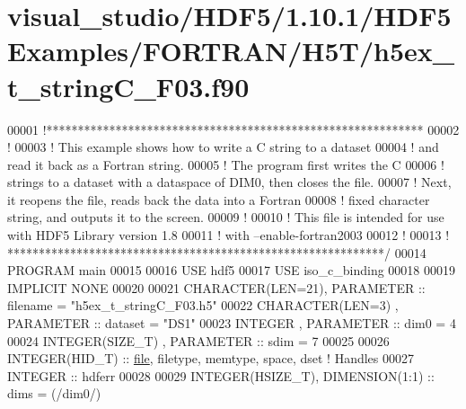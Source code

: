 \hypertarget{visual__studio_2_h_d_f5_21_810_81_2_h_d_f5_examples_2_f_o_r_t_r_a_n_2_h5_t_2h5ex__t__string_c___f03_8f90_source}{}\section{visual\+\_\+studio/\+H\+D\+F5/1.10.1/\+H\+D\+F5\+Examples/\+F\+O\+R\+T\+R\+A\+N/\+H5\+T/h5ex\+\_\+t\+\_\+string\+C\+\_\+\+F03.f90}
\label{visual__studio_2_h_d_f5_21_810_81_2_h_d_f5_examples_2_f_o_r_t_r_a_n_2_h5_t_2h5ex__t__string_c___f03_8f90_source}

\begin{DoxyCode}
00001 \textcolor{comment}{!************************************************************}
00002 \textcolor{comment}{!}
00003 \textcolor{comment}{!  This example shows how to write a C string to a dataset }
00004 \textcolor{comment}{!  and read it back as a Fortran string.}
00005 \textcolor{comment}{!  The program first writes the C }
00006 \textcolor{comment}{!  strings to a dataset with a dataspace of DIM0, then closes the file.}
00007 \textcolor{comment}{!  Next, it reopens the file, reads back the data into a Fortran}
00008 \textcolor{comment}{!  fixed character string, and outputs it to the screen.}
00009 \textcolor{comment}{!}
00010 \textcolor{comment}{!  This file is intended for use with HDF5 Library version 1.8}
00011 \textcolor{comment}{!  with --enable-fortran2003 }
00012 \textcolor{comment}{!}
00013 \textcolor{comment}{! ************************************************************/}
00014 \textcolor{keyword}{PROGRAM} main
00015 
00016   \textcolor{keywordtype}{USE }hdf5
00017   \textcolor{keywordtype}{USE }iso\_c\_binding
00018 
00019   \textcolor{keywordtype}{IMPLICIT NONE}
00020 
00021   \textcolor{keywordtype}{CHARACTER(LEN=21)}, \textcolor{keywordtype}{PARAMETER} :: filename  = \textcolor{stringliteral}{"h5ex\_t\_stringC\_F03.h5"}
00022   \textcolor{keywordtype}{CHARACTER(LEN=3)} , \textcolor{keywordtype}{PARAMETER} :: dataset   = \textcolor{stringliteral}{"DS1"}
00023   \textcolor{keywordtype}{INTEGER}          , \textcolor{keywordtype}{PARAMETER} :: dim0      = 4
00024   \textcolor{keywordtype}{INTEGER(SIZE\_T)}  , \textcolor{keywordtype}{PARAMETER} :: sdim      = 7
00025 
00026   \textcolor{keywordtype}{INTEGER(HID\_T)}  :: \hyperlink{structfile}{file}, filetype, memtype, space, dset \textcolor{comment}{! Handles}
00027   \textcolor{keywordtype}{INTEGER} :: hdferr
00028 
00029   \textcolor{keywordtype}{INTEGER(HSIZE\_T)}, \textcolor{keywordtype}{DIMENSION(1:1)} :: dims = (/dim0/)

\end{DoxyCode}
